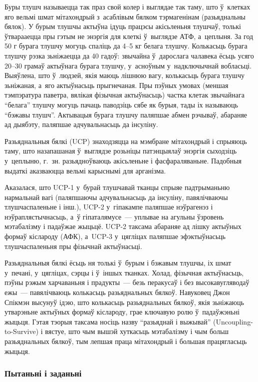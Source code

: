 Буры тлушч называецца так праз свой колер і выглядае так таму, што ў~клетках яго вельмі шмат мітахондрый з~асаблівым бялком тэрмагенінам (разьяднальны бялок). У бурым тлушчы актыўна ідуць працэсы акісьленьня тлушчаў, толькі ўтварааецца пры гэтым не энэргія для клеткі ў~выглядзе АТФ, а~цеплыня. За год 50 г бурага тлушчу могуць спаліць да 4--5 кг белага тлушчу. Колькасьць бурага тлушчу рэзка зьніжаецца да 40 гадоў: звычайна ў~дарослага чалавека ёсьць усяго 20--30 грамаў актыўнага бурага тлушчу, у~асноўным у~надключычнай вобласьці. Выяўлена, што ў~людзей, якія маюць лішнюю вагу, колькасьць бурага тлушчу зьніжаная, а~яго актыўнасьць прыгнечаная. Пры пэўных умовах (меншая тэмпэратура паветра, вялікая фізычная актыўнасьць) частка клетак звычайнага ``белага'' тлушчу могуць пачаць паводзіць сябе як бурыя, тады іх называюць ``бэжавы тлушч''. Актывацыя бурага тлушчу паляпшае абмен рэчываў, абараняе ад дыябэту, паляпшае адчувальнасьць да інсуліну.

Разьяднальныя бялкі (UCP) знаходзяцца на мэмбране мітахондрый і спрыяюць таму, што назапашаная ў~выглядзе розьніцы патэнцыялаў энэргія сыходзіць у~цеплыню, г.~зн. разьядноўваюць акісьленьне і фасфараляваньне. Падобныя выдаткі аказваюцца вельмі карыснымі для арганізма.

Аказалася, што UCP-1 у~бурай тлушчавай тканцы спрыяе падтрыманьню нармальнай вагі (паляпшаючы адчувальнасьць да інсуліну, павялічваючы тлушчаспаленьне і інш.), UCP-2 у~гіпакампе паляпшае нэўрагенэз і нэўраплястычнасьць, а~ў гіпаталямусе~--- уплывае на агульны ўзровень мэтабалізму і падаўжае жыцьцё. UCP-2 таксама абараняе ад лішку актыўных формаў кіслароду (АФК), а~UCP-3 у~цягліцах паляпшае эфэктыўнасьць тлушчаспаленьня пры фізычнай актыўнасьці.

Разьяднальныя бялкі ёсьць ня толькі ў~бурым і бэжавым тлушчы, іх шмат у~печані, у~цягліцах, сэрцы і ў~іншых тканках. Холад, фізычная актыўнасьць, пэўны рэжым харчаваньня і прадукты~--- безь перакусаў і без высокавугляводаў ежы~--- павялічваюць колькасьць разьяднальных бялкоў. Навуковец Джон Спікмэн высунуў ідэю, што колькасьць разьяднальных бялкоў, якія зьніжаюць утварэньне актыўных формаў кіслароду, грае ключавую ролю ў~падаўжэньні жыцьця. Гэтая тэорыя таксама носіць назву ``разьяднай і выжывай'' (Uncoupling-to-Survive) і вястуе, што чым вышэй хуткасьць мэтабалізму і чым больш разьяднальных бялкоў, тым лепшая праца мітахондрый і большая працягласьць жыцьця.

\subsubsection{Пытаньні і заданьні}

